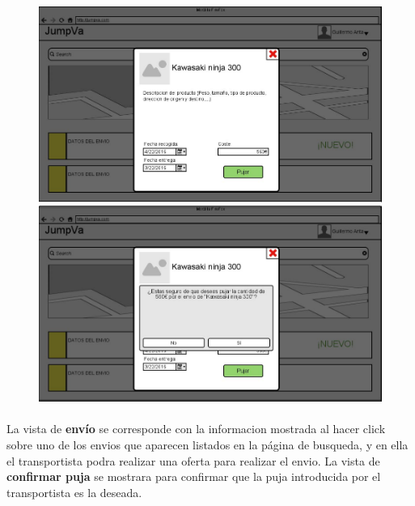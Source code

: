 \documentclass[10pt, a4paper,spanish]{article}
\begin{document}
			\begin{figure}[H]
				\centering
				\begin{minipage}[b]{0.49\textwidth}
					\includegraphics[width=\textwidth]{res/DetallesDeEnvio.png}
				\end{minipage}
				\begin{minipage}[b]{0.49\textwidth}
					\includegraphics[width=\textwidth]{res/ConfirmacionDePuja.png}
				\end{minipage}
			\end{figure}

			\paragraph{}
			La vista de \textbf{envío} se corresponde con la informacion mostrada al hacer click sobre uno de los envios que aparecen listados en la página de busqueda, y en ella el transportista podra realizar una oferta para realizar el envio. La vista de \textbf{confirmar puja} se mostrara para confirmar que la puja introducida por el transportista es la deseada.
\end{document}
